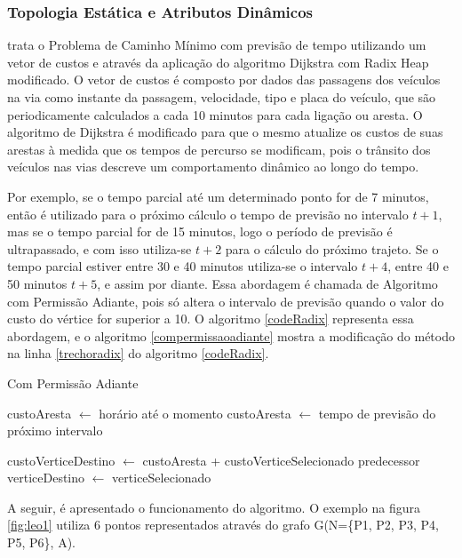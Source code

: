 \subsubsection{Topologia Estática e Atributos Dinâmicos}
\label{subsec:limitesuperior}
\cite{leonard} trata o Problema de Caminho Mínimo com previsão de tempo utilizando um vetor de custos e
através da aplicação do algoritmo Dijkstra com Radix Heap modificado. O vetor de custos é composto por dados das passagens 
dos veículos na via como instante da passagem, velocidade, tipo e placa do veículo, que são periodicamente calculados
a cada 10 minutos para cada ligação ou aresta. O algoritmo de Dijkstra é modificado para que o mesmo atualize os custos
de suas arestas à medida que os tempos de percurso se modificam, pois o trânsito dos veículos nas vias descreve um
comportamento dinâmico ao longo do tempo.

Por exemplo, se o tempo parcial até um determinado ponto for de 7 minutos, então
é utilizado para o próximo cálculo o tempo de previsão no intervalo $t + 1$, mas se o tempo parcial for de 15 minutos, logo
o período de previsão é ultrapassado, e com isso utiliza-se $t + 2$ para o cálculo do próximo trajeto. Se o tempo parcial
estiver entre 30 e 40 minutos utiliza-se o intervalo $t + 4$, entre 40 e 50 minutos $t + 5$, e assim por diante.
Essa abordagem é chamada de Algoritmo com Permissão Adiante, pois só altera o intervalo de previsão quando o valor do custo
do vértice for superior a 10.
O algoritmo \ref{codeRadix} representa essa abordagem, e o algoritmo \ref{compermissaoadiante} mostra a modificação
do método na linha \ref{trechoradix} do algoritmo \ref{codeRadix}.

\begin{algorithm}
\caption{Com Permissão Adiante}
\begin{algorithmic}[1]
\State custoAresta $\leftarrow$ horário até o momento
  \State custoAresta $\leftarrow$ tempo de previsão do próximo intervalo
\EndIf

  \State custoVerticeDestino $\leftarrow$ custoAresta + custoVerticeSelecionado
  \State predecessor verticeDestino $\leftarrow$ verticeSelecionado 
\EndIf
\end{algorithmic}
\label{compermissaoadiante}
\end{algorithm}
\FloatBarrier

A seguir, é apresentado o funcionamento do algoritmo. O exemplo na figura \ref{fig:leo1} utiliza
6 pontos representados através do grafo G(N=\{P1, P2, P3, P4, P5, P6\}, A).

